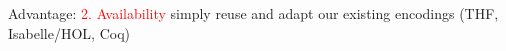 \documentclass[9pt,mathserif,unknownkeysallowed,xcolor=dvipsnames]{beamer}
\begin{document}
\begin{frame}{Advantage: \textcolor{red}{2. Availability}}
{simply reuse and adapt our existing encodings (THF, Isabelle/HOL,
  Coq)}
\end{frame}
\end{document}
